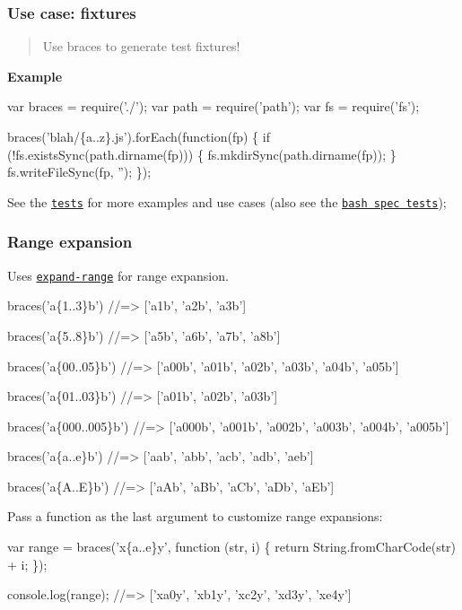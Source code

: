 \subsubsection*{Use case\+: fixtures}

\begin{quote}
Use braces to generate test fixtures! \end{quote}


{\bfseries Example}


\begin{DoxyCode}
var braces = require('./');
var path = require('path');
var fs = require('fs');

braces('blah/\{a..z\}.js').forEach(function(fp) \{
  if (!fs.existsSync(path.dirname(fp))) \{
    fs.mkdirSync(path.dirname(fp));
  \}
  fs.writeFileSync(fp, '');
\});
\end{DoxyCode}


See the \href{./test/test.js}{\tt tests} for more examples and use cases (also see the \href{./test/bash-mm-adjusted.js}{\tt bash spec tests});

\subsubsection*{Range expansion}

Uses \href{https://github.com/jonschlinkert/expand-range}{\tt expand-\/range} for range expansion.


\begin{DoxyCode}
braces('a\{1..3\}b')
//=> ['a1b', 'a2b', 'a3b']

braces('a\{5..8\}b')
//=> ['a5b', 'a6b', 'a7b', 'a8b']

braces('a\{00..05\}b')
//=> ['a00b', 'a01b', 'a02b', 'a03b', 'a04b', 'a05b']

braces('a\{01..03\}b')
//=> ['a01b', 'a02b', 'a03b']

braces('a\{000..005\}b')
//=> ['a000b', 'a001b', 'a002b', 'a003b', 'a004b', 'a005b']

braces('a\{a..e\}b')
//=> ['aab', 'abb', 'acb', 'adb', 'aeb']

braces('a\{A..E\}b')
//=> ['aAb', 'aBb', 'aCb', 'aDb', 'aEb']
\end{DoxyCode}


Pass a function as the last argument to customize range expansions\+:


\begin{DoxyCode}
var range = braces('x\{a..e\}y', function (str, i) \{
  return String.fromCharCode(str) + i;
\});

console.log(range);
//=> ['xa0y', 'xb1y', 'xc2y', 'xd3y', 'xe4y']
\end{DoxyCode}


